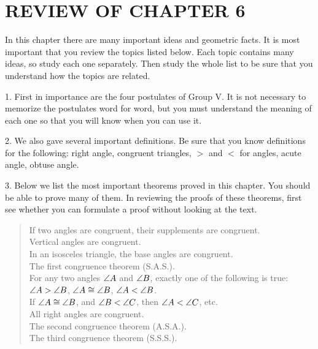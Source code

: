 \documentclass[11pt]{book}
\begin{document}
\section*{REVIEW OF CHAPTER 6}

In this chapter there are many important ideas and geometric facts. It is most
important that you review the topics listed below. Each topic contains many
ideas, so study each one separately. Then study the whole list to be sure that
you understand how the topics are related.

1. First in importance are the four postulates of Group V. It is not necessary
to memorize the postulates word for word, but you must understand the meaning
of each one so that you will know when you can use it.

2. We also gave several important definitions. Be sure that you know
definitions for the following: right angle, congruent triangles, $>$ and $<$
for angles, acute angle, obtuse angle.

3. Below we list the most important theorems proved in this chapter. You should
be able to prove many of them. In reviewing the proofs of these theorems, first
see whether you can formulate a proof without looking at the text.

\begin{quote}
If two angles are congruent, their supplements are congruent.\\
Vertical angles are congruent.\\
In an isosceles triangle, the base angles are congruent.\\
The first congruence theorem (S.A.S.).\\
For any two angles $\angle A$ and $\angle B$, exactly one of the following is
true: $\angle A > \angle B$, $\angle A \cong \angle B$, $\angle A < \angle B$.\\
If $\angle A \cong \angle B$, and $\angle B < \angle C$, then $\angle A < \angle C$,
etc.\\
All right angles are congruent.\\
The second congruence theorem (A.S.A.).\\
The third congruence theorem (S.S.S.).
\end{quote}
\end{document}
